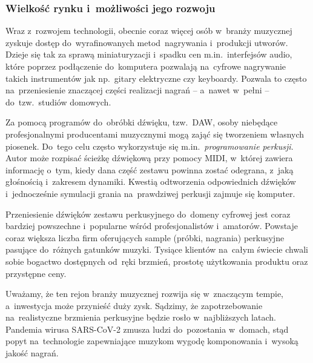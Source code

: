 \documentclass[12pt]{article}
\begin{document}
\subsubsection{Wielkość rynku i~możliwości jego rozwoju}


Wraz z~rozwojem technologii, obecnie coraz więcej osób w~branży muzycznej zyskuje dostęp do~wyrafinowanych metod~nagrywania i~produkcji utworów.
Dzieje się tak za sprawą miniaturyzacji i~spadku cen m.in.~interfejsów audio, które poprzez podłączenie do~komputera pozwalają na~cyfrowe nagrywanie takich instrumentów jak np.~gitary elektryczne czy keyboardy.
Pozwala to często na~przeniesienie znaczącej części realizacji nagrań -- a~nawet w~pełni -- do~tzw.~studiów domowych.

Za pomocą programów do~obróbki dźwięku, tzw.~DAW, osoby niebędące profesjonalnymi producentami muzycznymi mogą zająć się tworzeniem własnych piosenek.
Do~tego celu często wykorzystuje się m.in.~\emph{programowanie perkusji}.
Autor może rozpisać ścieżkę dźwiękową przy pomocy MIDI, w~której zawiera informację o~tym, kiedy dana część zestawu powinna zostać odegrana, z~jaką głośnością i~zakresem dynamiki.
Kwestią odtworzenia odpowiednich dźwięków i~jednocześnie symulacji grania na~prawdziwej perkusji zajmuje się komputer.

Przeniesienie dźwięków zestawu perkusyjnego do~domeny cyfrowej jest coraz bardziej powszechne i~popularne wśród profesjonalistów i~amatorów.
Powstaje coraz większa liczba firm oferujących sample (próbki, nagrania) perkusyjne pasujące do~różnych gatunków muzyki.
Tysiące klientów na~całym świecie chwali sobie bogactwo dostępnych od~ręki brzmień, prostotę użytkowania produktu oraz przystępne ceny.

Uważamy, że ten rejon branży muzycznej rozwija się w~znaczącym tempie, a~inwestycja może przynieść duży zysk.
Sądzimy, że zapotrzebowanie na~realistyczne brzmienia perkusyjne będzie rosło w~najbliższych latach.
Pandemia wirusa SARS-CoV-2 zmusza ludzi do~pozostania w~domach, stąd popyt na~technologie zapewniające muzykom wygodę komponowania i~wysoką jakość nagrań.
\end{document}
